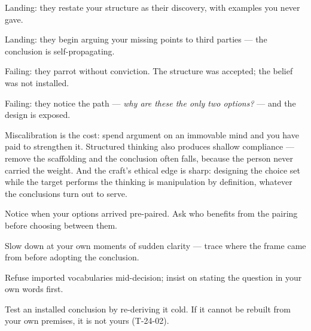 \begin{feedback}
  \item Landing: they restate your structure as their discovery, with examples you never gave.
  \item Landing: they begin arguing your missing points to third parties --- the conclusion is self-propagating.
  \item Failing: they parrot without conviction. The structure was accepted; the belief was not installed.
  \item Failing: they notice the path --- \emph{why are these the only two options?} --- and the design is exposed.
\end{feedback}
\begin{failure}
Miscalibration is the cost: spend argument on an immovable mind and you have paid to strengthen it. Structured thinking also produces shallow compliance --- remove the scaffolding and the conclusion often falls, because the person never carried the weight. And the craft's ethical edge is sharp: designing the choice set while the target performs the thinking is manipulation by definition, whatever the conclusions turn out to serve.
\end{failure}
\begin{countermeasures}
  \item Notice when your options arrived pre-paired. Ask who benefits from the pairing before choosing between them.
  \item Slow down at your own moments of sudden clarity --- trace where the frame came from before adopting the conclusion.
  \item Refuse imported vocabularies mid-decision; insist on stating the question in your own words first.
  \item Test an installed conclusion by re-deriving it cold. If it cannot be rebuilt from your own premises, it is not yours (T-24-02).
\end{countermeasures}

\seesources
{}
